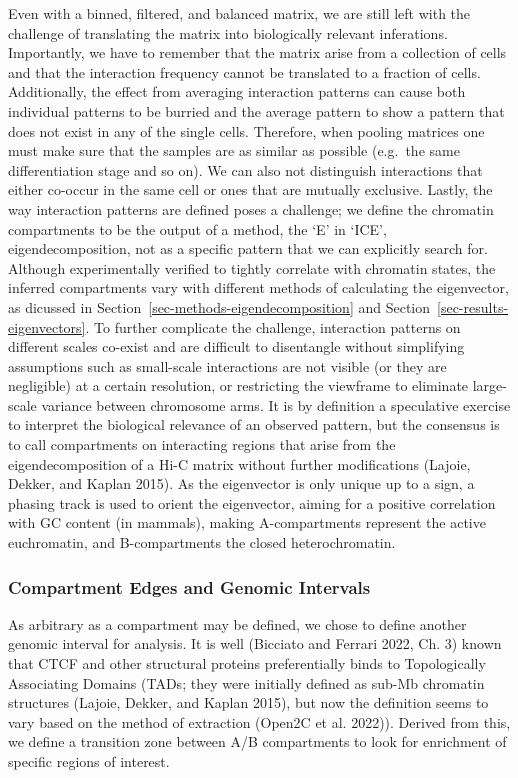 \documentclass[
  11pt,
  a4paper,
]{scrbook}
\begin{document}
Even with a binned, filtered, and balanced matrix, we are still left
with the challenge of translating the matrix into biologically relevant
inferations. Importantly, we have to remember that the matrix arise from
a collection of cells and that the interaction frequency cannot be
translated to a fraction of cells. Additionally, the effect from
averaging interaction patterns can cause both individual patterns to be
burried and the average pattern to show a pattern that does not exist in
any of the single cells. Therefore, when pooling matrices one must make
sure that the samples are as similar as possible (e.g.~the same
differentiation stage and so on). We can also not distinguish
interactions that either co-occur in the same cell or ones that are
mutually exclusive. Lastly, the way interaction patterns are defined
poses a challenge; we define the chromatin compartments to be the output
of a method, the `E' in `ICE', eigendecomposition, not as a specific
pattern that we can explicitly search for. Although experimentally
verified to tightly correlate with chromatin states, the inferred
compartments vary with different methods of calculating the eigenvector,
as dicussed in Section~\ref{sec-methods-eigendecomposition} and
Section~\ref{sec-results-eigenvectors}. To further complicate the
challenge, interaction patterns on different scales co-exist and are
difficult to disentangle without simplifying assumptions such as
small-scale interactions are not visible (or they are negligible) at a
certain resolution, or restricting the viewframe to eliminate
large-scale variance between chromosome arms. It is by definition a
speculative exercise to interpret the biological relevance of an
observed pattern, but the consensus is to call compartments on
interacting regions that arise from the eigendecomposition of a Hi-C
matrix without further modifications (Lajoie, Dekker, and Kaplan 2015).
As the eigenvector is only unique up to a sign, a phasing track is used
to orient the eigenvector, aiming for a positive correlation with GC
content (in mammals), making A-compartments represent the active
euchromatin, and B-compartments the closed heterochromatin.

\subsubsection{Compartment Edges and Genomic
Intervals}\label{compartment-edges-and-genomic-intervals}

As arbitrary as a compartment may be defined, we chose to define another
genomic interval for analysis. It is well (Bicciato and Ferrari 2022,
Ch. 3) known that CTCF and other structural proteins preferentially
binds to Topologically Associating Domains (TADs; they were initially
defined as sub-Mb chromatin structures (Lajoie, Dekker, and Kaplan
2015), but now the definition seems to vary based on the method of
extraction (Open2C et al. 2022)). Derived from this, we define a
transition zone between A/B compartments to look for enrichment of
specific regions of interest.
\end{document}
